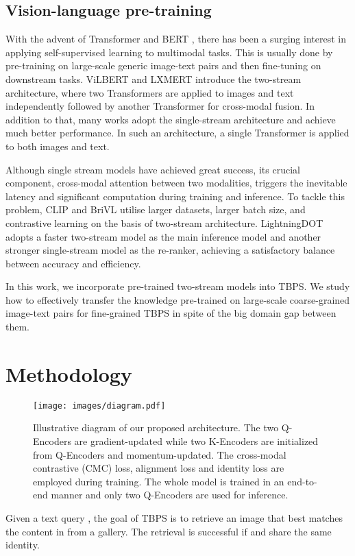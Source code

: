 \documentclass{bmvc2k}
\begin{document}
\vspace*{-3mm}
\subsection{Vision-language pre-training}
With the advent of Transformer \cite{vaswani2017transformer} and BERT \cite{devlin2018bert}, there has been a surging interest in applying self-supervised learning to multimodal tasks. This is usually done by pre-training on large-scale generic image-text pairs and then fine-tuning on downstream tasks.
ViLBERT \cite{lu2019vilbert} and LXMERT \cite{tan2019lxmert} introduce the two-stream architecture, where two Transformers are applied to images and text independently followed by another Transformer for cross-modal fusion. 
In addition to that, many works \cite{su2019vlbert, chen2020uniter,li2020oscar,kim2021vilt} adopt the single-stream architecture and achieve much better performance. 
In such an architecture, a single Transformer is applied to both images and text.

Although single stream models have achieved great success, its crucial component, cross-modal attention between two modalities, triggers the inevitable latency and significant computation during training and inference. 
To tackle this problem, CLIP \cite{radford2021clip} and BriVL \cite{huo2021wenlan} utilise larger datasets, larger batch size, and contrastive learning on the basis of two-stream architecture. 
LightningDOT \cite{sun2021lightningdot} adopts a faster two-stream model as the main inference model and another stronger single-stream model as the re-ranker, achieving a satisfactory balance between accuracy and efficiency.

In this work, we incorporate pre-trained two-stream models into TBPS. 
We study how to effectively transfer the knowledge pre-trained on large-scale coarse-grained image-text pairs for fine-grained TBPS in spite of the big domain gap between them.
 \vspace*{-3mm}
\section{Methodology}

\begin{figure}[t]
\centering
\texttt{[image: images/diagram.pdf]}
\vspace*{-6mm}
\caption{Illustrative diagram of our proposed architecture. The two Q-Encoders are gradient-updated while two K-Encoders are initialized from Q-Encoders and momentum-updated. The cross-modal contrastive (CMC) loss, alignment loss and identity loss are employed during training. The whole model is trained in an end-to-end manner and only two Q-Encoders are used for inference.}
\label{overall_arch}
\vspace*{-3mm}
\end{figure} Given a text query , the goal of TBPS is to retrieve an image  that best matches the content in  from a gallery. 
The retrieval is successful if  and  share the same identity.
\end{document}

